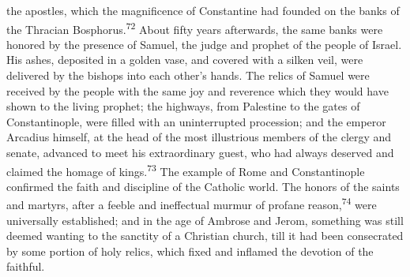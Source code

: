 the apostles, which the magnificence of Constantine had founded
on the banks of the Thracian Bosphorus.\textsuperscript{72} About fifty years
afterwards, the same banks were honored by the presence of
Samuel, the judge and prophet of the people of Israel. His ashes,
deposited in a golden vase, and covered with a silken veil, were
delivered by the bishops into each other’s hands. The relics of
Samuel were received by the people with the same joy and
reverence which they would have shown to the living prophet; the
highways, from Palestine to the gates of Constantinople, were
filled with an uninterrupted procession; and the emperor Arcadius
himself, at the head of the most illustrious members of the
clergy and senate, advanced to meet his extraordinary guest, who
had always deserved and claimed the homage of kings.\textsuperscript{73} The
example of Rome and Constantinople confirmed the faith and
discipline of the Catholic world. The honors of the saints and
martyrs, after a feeble and ineffectual murmur of profane reason,\textsuperscript{74}
were universally established; and in the age of Ambrose and
Jerom, something was still deemed wanting to the sanctity of a
Christian church, till it had been consecrated by some portion of
holy relics, which fixed and inflamed the devotion of the
faithful.







